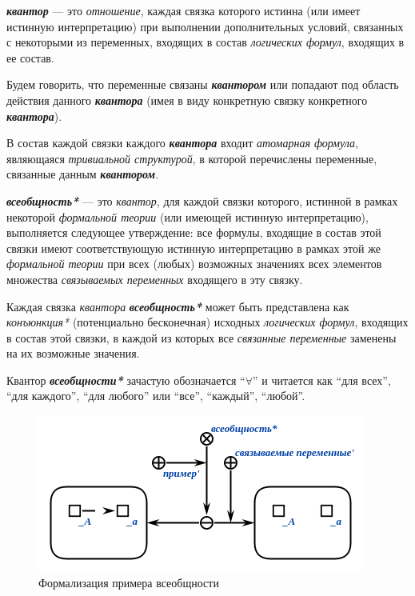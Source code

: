 \begin{SCn}
\end{SCn}

\textbf{\textit{квантор}} — это \textit{отношение}, каждая связка которого истинна (или имеет истинную интерпретацию) при выполнении дополнительных условий, связанных с некоторыми из переменных, входящих в состав \textit{логических формул}, входящих в ее состав.

Будем говорить, что переменные связаны \textbf{\textit{квантором}} или попадают под область действия данного \textbf{\textit{квантора}} (имея в виду конкретную связку конкретного \textbf{\textit{квантора}}).

В состав каждой связки каждого \textbf{\textit{квантора}} входит \textit{атомарная формула}, являющаяся \textit{тривиальной структурой}, в которой перечислены переменные, связанные данным \textbf{\textit{квантором}}.

\begin{SCn}
\end{SCn}

\textbf{\textit{всеобщность*}} --- это \textit{квантор}, для каждой связки которого, истинной в рамках некоторой \textit{формальной теории} (или имеющей истинную интерпретацию), выполняется следующее утверждение: все формулы, входящие в состав этой связки имеют соответствующую истинную интерпретацию в рамках этой же \textit{формальной теории} при всех (любых) возможных значениях всех элементов множества \textit{связываемых переменных\scnrolesign} входящего в эту связку.

Каждая связка \textit{квантора} \textbf{\textit{всеобщность*}} может быть представлена как \textit{конъюнкция*} (потенциально бесконечная) исходных \textit{логических формул}, входящих в состав этой связки, в каждой из которых все \textit{связанные переменные\scnrolesign} заменены на их возможные значения.

Квантор \textbf{\textit{всеобщности*}} зачастую обозначается ``$\forall$'' и читается как ``для всех'', ``для каждого'', ``для любого'' или ``все'', ``каждый'', ``любой''.

\begin{figure}[http]
\includegraphics[scale=0.8]{author/part2/figures/logic/universality.png}
\caption{Формализация примера всеобщности}
\label{fig:universality}
\end{figure}

